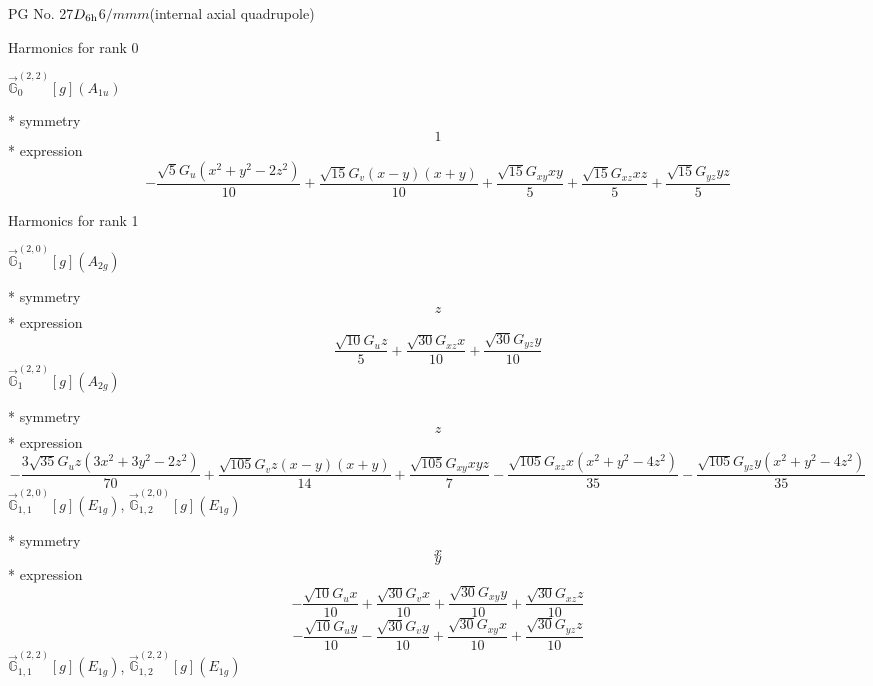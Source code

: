 \documentclass[fleqn,8pt]{jsarticle}
\begin{document}
\setcounter{MaxMatrixCols}{32}

\renewcommand{\tablename}{Table~}
\renewcommand{\figurename}{Figure~}
\begin{center}
\LARGE
PG No. 27\quad$D_{\rm 6h}$\quad$6/mmm$\quad[ hexagonal ] (internal axial quadrupole)
\end{center}

\noindent * Harmonics for rank 0

\noindent\quad $\vec{\mathbb{G}}_{0}^{(2,2)}[g](A_{1u})$

\noindent\quad ** symmetry
\begin{dmath*}
1
\end{dmath*}
\noindent\quad ** expression
\begin{dmath*}
- \frac{\sqrt{5} G_{u} \left(x^{2} + y^{2} - 2 z^{2}\right)}{10} + \frac{\sqrt{15} G_{v} \left(x - y\right) \left(x + y\right)}{10} + \frac{\sqrt{15} G_{xy} x y}{5} + \frac{\sqrt{15} G_{xz} x z}{5} + \frac{\sqrt{15} G_{yz} y z}{5}
\end{dmath*}

\noindent * Harmonics for rank 1

\noindent\quad $\vec{\mathbb{G}}_{1}^{(2,0)}[g](A_{2g})$

\noindent\quad ** symmetry
\begin{dmath*}
z
\end{dmath*}
\noindent\quad ** expression
\begin{dmath*}
\frac{\sqrt{10} G_{u} z}{5} + \frac{\sqrt{30} G_{xz} x}{10} + \frac{\sqrt{30} G_{yz} y}{10}
\end{dmath*}
\noindent\quad $\vec{\mathbb{G}}_{1}^{(2,2)}[g](A_{2g})$

\noindent\quad ** symmetry
\begin{dmath*}
z
\end{dmath*}
\noindent\quad ** expression
\begin{dmath*}
- \frac{3 \sqrt{35} G_{u} z \left(3 x^{2} + 3 y^{2} - 2 z^{2}\right)}{70} + \frac{\sqrt{105} G_{v} z \left(x - y\right) \left(x + y\right)}{14} + \frac{\sqrt{105} G_{xy} x y z}{7} - \frac{\sqrt{105} G_{xz} x \left(x^{2} + y^{2} - 4 z^{2}\right)}{35} - \frac{\sqrt{105} G_{yz} y \left(x^{2} + y^{2} - 4 z^{2}\right)}{35}
\end{dmath*}
\noindent\quad $\vec{\mathbb{G}}_{1,1}^{(2,0)}[g](E_{1g})$, $\vec{\mathbb{G}}_{1,2}^{(2,0)}[g](E_{1g})$

\noindent\quad ** symmetry
\begin{dmath*}
x
\end{dmath*}
\begin{dmath*}
y
\end{dmath*}
\noindent\quad ** expression
\begin{dmath*}
- \frac{\sqrt{10} G_{u} x}{10} + \frac{\sqrt{30} G_{v} x}{10} + \frac{\sqrt{30} G_{xy} y}{10} + \frac{\sqrt{30} G_{xz} z}{10}
\end{dmath*}
\begin{dmath*}
- \frac{\sqrt{10} G_{u} y}{10} - \frac{\sqrt{30} G_{v} y}{10} + \frac{\sqrt{30} G_{xy} x}{10} + \frac{\sqrt{30} G_{yz} z}{10}
\end{dmath*}
\noindent\quad $\vec{\mathbb{G}}_{1,1}^{(2,2)}[g](E_{1g})$, $\vec{\mathbb{G}}_{1,2}^{(2,2)}[g](E_{1g})$
\end{document}
